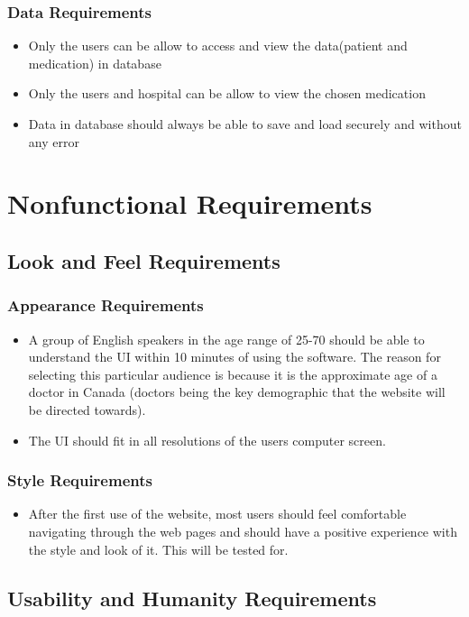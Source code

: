 \documentclass[12pt]{article}
\begin{document}
\subsubsection{Data Requirements}
\begin{itemize}
\item Only the users can be allow to access and view the data(patient and medication) in database
\item Only the users and hospital can be allow to view the chosen medication
\item Data in database should always be able to save and load securely and without any error 
\end{itemize}

\section{Nonfunctional Requirements}
\setcounter{subsection}{9}
\subsection{Look and Feel Requirements}
\subsubsection{Appearance Requirements}
\begin{itemize}
\item A group of English speakers in the age range of 25-70 should be able to understand the UI within 10 minutes of using the software. The reason for selecting this particular audience is because it is the approximate age of a doctor in Canada (doctors being the key demographic that the website will be directed towards).
\item The UI should fit in all resolutions of the users computer screen.
\end{itemize}

\subsubsection{Style Requirements}
\begin{itemize}
\item After the first use of the website, most users should feel comfortable navigating through the web pages and should have a positive experience with the style and look of it. This will be tested for.
\end{itemize}

\subsection{Usability and Humanity Requirements}
\end{document}
